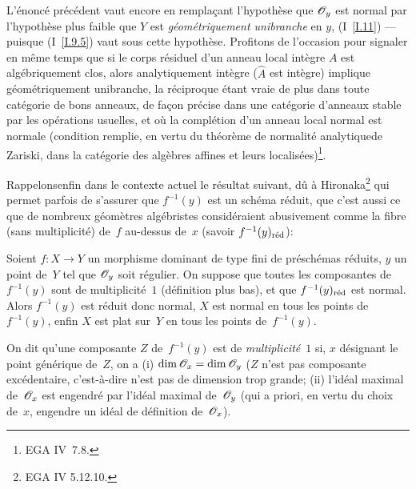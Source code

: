 \begin{remarques}
\label{II.2.4}
L'\'enonc\'e pr\'ec\'edent vaut encore en rempla\c cant
l'hypoth\`ese que $\cal{O}_{y}$ est normal par l'hypoth\`ese plus
faible que $Y$ est \emph{géométriquement unibranche} en $y$,
(\cf I~\ref{I.11}) --- puisque (I~\ref{I.9.5}) vaut sous cette
hypoth\`ese. Profitons de l'occasion pour signaler en m\^eme temps
que si le corps r\'esiduel d'un anneau local int\`egre $A$ est
alg\'ebriquement clos, alors analytiquement int\`egre
(\ie $\widehat{A}$ est int\`egre) implique g\'eom\'etriquement
unibranche, la r\'eciproque \'etant vraie de plus dans toute
cat\'egorie de \og bons anneaux\fg, de fa\c con pr\'ecise dans une
cat\'egorie d'anneaux stable par les op\'erations usuelles, et
o\`u la compl\'etion d'un anneau local normal est normale
(condition remplie, en vertu du \og th\'eor\`eme de normalit\'e
analytique\fg de Zariski, dans la cat\'egorie des alg\`ebres
affines et leurs localis\'ees)\footnote{\Cf EGA IV~7.8.}.

\og Rappelons\fg enfin dans le contexte actuel le r\'esultat suivant,
d\^u \`a Hironaka\footnote{\Cf EGA IV 5.12.10.} qui permet parfois
de s'assurer que $f^{-1}(y)$ est un sch\'ema r\'eduit, \ie que
c'est aussi ce que de nombreux g\'eom\`etres alg\'ebristes
consid\'eraient abusivement comme la fibre (sans multiplicit\'e)
de~$f$ au-dessus de~$x$ (savoir $f^{-1}(y)_{\mathrm{r\acute{e}d}}$):
\end{remarques}

\begin{proposition}
\label{II.2.5}
Soient $f\colon X\to Y$ un morphisme dominant de type fini de
pr\'esch\'emas r\'eduits, $y$ un point de~$Y$ tel que
$\cal{O}_{y}$ soit r\'egulier. On suppose que toutes les composantes
de~$f^{-1}(y)$ sont de multiplicit\'e~$1$
(\cf d\'efinition plus bas), et que $f^{-1}(y)_{\mathrm{r\acute{e}d}}$ est
normal. Alors $f^{-1}(y)$ est r\'eduit donc normal, $X$ est normal
en tous les points de~$f^{-1}(y)$, enfin $X$ est plat sur~$Y$ en tous
les points de~$f^{-1}(y)$.
\end{proposition}
On
dit qu'une composante $Z$ de~$f^{-1}(y)$ est de
\emph{multiplicité}~$1$
si, $x$ d\'esignant le point g\'en\'erique de~$Z$, on a (i)
$\dim\cal{O}_{x}=\dim\cal{O}_{y}$ (\ie $Z$ n'est pas \og composante
exc\'edentaire\fg, c'est-\`a-dire n'est pas \og de dimension trop
grande\fg; (ii) l'id\'eal maximal de~$\cal{O}_{x}$ est engendr\'e
par l'id\'eal maximal de~$\cal{O}_{y}$ (qui a priori, en vertu du
choix de~$x$, engendre un id\'eal de d\'efinition
de~$\cal{O}_{x}$).

